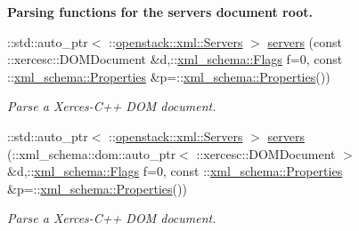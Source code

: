 \begin{Indent}{\bf Parsing functions for the servers document root.}
\begin{DoxyCompactItemize}
::std::auto\_\-ptr$<$ ::\hyperlink{classopenstack_1_1xml_1_1Servers}{openstack::xml::Servers} $>$ \hyperlink{namespaceopenstack_1_1xml_a4ee3753f1380b2d4bd5a19224c9d9f37}{servers} (const ::xercesc::DOMDocument \&d,::\hyperlink{namespacexml__schema_affb4c227cbd9aa7453dd1dc5a1401943}{xml\_\-schema::Flags} f=0, const ::\hyperlink{namespacexml__schema_ad27ce19a7ee1d3b1064092648898f64c}{xml\_\-schema::Properties} \&p=::\hyperlink{namespacexml__schema_ad27ce19a7ee1d3b1064092648898f64c}{xml\_\-schema::Properties}())
\begin{DoxyCompactList}\small\item\em Parse a Xerces-\/C++ DOM document. \item\end{DoxyCompactList}\item 
::std::auto\_\-ptr$<$ ::\hyperlink{classopenstack_1_1xml_1_1Servers}{openstack::xml::Servers} $>$ \hyperlink{namespaceopenstack_1_1xml_a79b3ff8d71d3b030aa8d5b1a11655c3b}{servers} (::xml\_\-schema::dom::auto\_\-ptr$<$ ::xercesc::DOMDocument $>$ \&d,::\hyperlink{namespacexml__schema_affb4c227cbd9aa7453dd1dc5a1401943}{xml\_\-schema::Flags} f=0, const ::\hyperlink{namespacexml__schema_ad27ce19a7ee1d3b1064092648898f64c}{xml\_\-schema::Properties} \&p=::\hyperlink{namespacexml__schema_ad27ce19a7ee1d3b1064092648898f64c}{xml\_\-schema::Properties}())
\begin{DoxyCompactList}\small\item\em Parse a Xerces-\/C++ DOM document. \item\end{DoxyCompactList}\end{DoxyCompactItemize}
\end{Indent}
